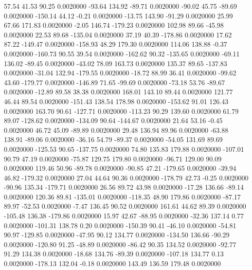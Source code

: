    57.54   41.53   90.25   0.0020000
  -93.64  134.92  -89.71   0.0020000
  -90.02   45.75  -89.69   0.0020000
 -150.14   44.12   -0.21   0.0020000
  -13.75  143.90  -91.29   0.0020000
   25.99   67.66  171.83   0.0020000
   -2.05  146.74 -179.23   0.0020000
  102.98   89.66  -45.98   0.0020000
   22.53   89.68 -135.04   0.0020000
   37.19   40.39 -178.86   0.0020000
   17.62   87.22 -149.47   0.0020000
 -158.93   48.29  179.30   0.0020000
  114.06  138.88   -0.37   0.0020000
 -160.73   90.55   39.54   0.0020000
 -162.62   90.32 -135.65   0.0020000
  -69.11  136.02  -89.45   0.0020000
  -43.02   78.09  163.73   0.0020000
  135.37   89.65 -137.83   0.0020000
  -31.04  132.94 -179.55   0.0020000
  -18.72   88.99   36.41   0.0020000
  -99.62   43.60 -179.77   0.0020000
 -146.89   71.65  -99.69   0.0020000
  -73.18   53.76  -89.67   0.0020000
  -12.89   89.58   38.38   0.0020000
  168.01  143.10   89.44   0.0020000
  121.77   46.44   89.54   0.0020000
 -151.43  138.54  178.98   0.0020000
 -153.62   91.01  126.43   0.0020000
  163.70   90.61 -127.71   0.0020000
 -113.23   90.29  139.60   0.0020000
   61.79   89.07 -128.62   0.0020000
 -134.09   90.64 -144.67   0.0020000
   21.64   53.16   -0.45   0.0020000
   46.72   45.09  -89.89   0.0020000
   29.48  136.94   89.96   0.0020000
  -63.88  138.91  -89.06   0.0020000
  -36.16   54.79  -89.37   0.0020000
  -54.05  131.69   89.69   0.0020000
 -125.53   90.65 -137.75   0.0020000
   74.80  135.83  179.88   0.0020000
 -107.01   90.79   47.19   0.0020000
  -75.87  129.75  179.80   0.0020000
  -96.71  129.00   90.09   0.0020000
  119.46   50.96  -89.78   0.0020000
  -90.85   47.21 -179.65   0.0020000
  -39.94   46.82 -179.32   0.0020000
   27.04   44.64   90.36   0.0020000
 -178.79   42.73   -0.25   0.0020000
  -90.96  135.34 -179.71   0.0020000
   26.56   89.72   43.98   0.0020000
  -17.28  136.66  -89.14   0.0020000
  120.36   89.81 -135.01   0.0020000
 -118.35   48.90  179.86   0.0020000
  -87.17   89.97  -52.53   0.0020000
   -7.47  136.45   90.52   0.0020000
  161.61   44.62   89.39   0.0020000
 -105.48  136.38 -179.86   0.0020000
   15.97   42.67  -88.95   0.0020000
  -32.36  137.14    0.77   0.0020000
 -101.31  138.78    0.20   0.0020000
 -150.39   90.41  -46.10   0.0020000
  -54.81   90.97 -129.85   0.0020000
  -47.95   90.12  134.77   0.0020000
 -134.50  136.66  -90.29   0.0020000
 -120.80   91.25  -48.89   0.0020000
  -86.42   90.35  134.52   0.0020000
  -92.77   91.29  134.38   0.0020000
  -18.68  134.76  -89.39   0.0020000
 -107.18  134.77    0.13   0.0020000
 -178.13  132.04   -0.18   0.0020000
  143.49  136.59  179.48   0.0020000
